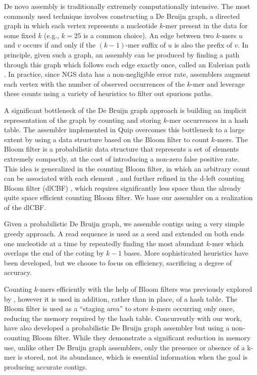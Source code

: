 \documentclass[twocolumn]{article}
\begin{document}

De novo assembly is traditionally extremely computationally intensive. The
most commonly used technique involves constructing a De Bruijn graph, a
directed graph in which each vertex represents a nucleotide $k$-mer present in
the data for some fixed $k$ (e.g., $k = 25$ is a common choice). An edge
between two $k$-mers $u$ and $v$ occurs if and only if the $(k-1)$-mer suffix
of $u$ is also the prefix of $v$. In principle, given such a graph, an
assembly can be produced by finding a path through this graph which follows
each edge exactly once, called an Eulerian path \citep{Pevzner2001}. In
practice, since NGS data has a non-negligible error rate, assemblers augment
each vertex with the number of observed occurrences of the $k$-mer and
leverage these counts using a variety of heuristics to filter out spurious
paths.

A significant bottleneck of the De Bruijn graph approach is building an
implicit representation of the graph by counting and storing $k$-mer
occurrences in a hash table. The assembler implemented in Quip overcomes this
bottleneck to a large extent by using a data structure based on the Bloom
filter to count $k$-mers. The Bloom filter \citep{Bloom1970} is a
probabilistic data structure that represents a set of elements extremely
compactly, at the cost of introducing a non-zero false positive rate. This
idea is generalized in the counting Bloom filter, in which an arbitrary count
can be associated with each element \citep{Fan2000}, and further refined in
the d-left counting Bloom filter (dlCBF) \citep{Bonomi2006}, which requires
significantly less space than the already quite space efficient counting Bloom
filter. We base our assembler on a realization of the dlCBF.

Given a probabilistic De Bruijn graph, we assemble contigs using a very simple
greedy approach. A read sequence is used as a seed and extended on both ends
one nucleotide at a time by repeatedly finding the most abundant $k$-mer which
overlaps the end of the coting by $k-1$ bases. More sophisticated heuristics
have been developed, but we choose to focus on efficiency, sacrificing a
degree of accuracy.

Counting $k$-mers efficiently with the help of Bloom filters was previously
explored by \citet{Melsted2011}, however it is used in addition, rather than
in place, of a hash table. The Bloom filter is used as a ``staging area'' to
store $k$-mers occurring only once, reducing the memory required by the hash
table. Concurrently with our work, \citet{Pell2011} have also developed a
probabilistic De Bruijn graph assembler but using a non-counting Bloom
filter. While they demonstrate a significant reduction in memory use, unlike
other De Bruijn graph assemblers, only the presence or absence of a k-mer is
stored, not its abundance, which is essential information when the goal is
producing accurate contigs.
\end{document}
